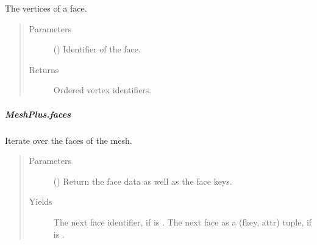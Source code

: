 \documentclass[letterpaper,10pt,english]{sphinxmanual}
\begin{document}
\begin{fulllineitems}
\begin{fulllineitems}
\label{\detokenize{api/generated/directional_clustering.mesh.MeshPlus.face_vertices:directional_clustering.mesh.MeshPlus.face_vertices}}
The vertices of a face.
\begin{quote}\begin{description}
\item[{Parameters}] \leavevmode
{} () \textendash{} Identifier of the face.

\item[{Returns}] \leavevmode
{} \textendash{} Ordered vertex identifiers.

\end{description}\end{quote}

\end{fulllineitems}



\subparagraph{MeshPlus.faces}
\label{\detokenize{api/generated/directional_clustering.mesh.MeshPlus.faces:meshplus-faces}}\label{\detokenize{api/generated/directional_clustering.mesh.MeshPlus.faces::doc}}

\begin{fulllineitems}
\label{\detokenize{api/generated/directional_clustering.mesh.MeshPlus.faces:directional_clustering.mesh.MeshPlus.faces}}
Iterate over the faces of the mesh.
\begin{quote}\begin{description}
\item[{Parameters}] \leavevmode
{} () \textendash{} Return the face data as well as the face keys.

\item[{Yields}] \leavevmode
{} \textendash{} The next face identifier, if  is .
The next face as a (fkey, attr) tuple, if  is .


\end{description}
\end{quote}
\end{fulllineitems}
\end{fulllineitems}
\end{document}
